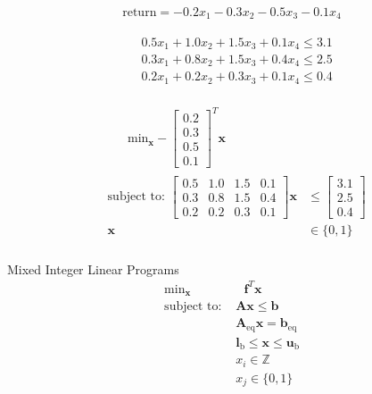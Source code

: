 \documentclass{article}
\begin{document}
\begin{align*}
    \text{return} = -0.2x_1 - 0.3x_2 - 0.5x_3 - 0.1x_4
\end{align*}

\begin{align*}
    &0.5x_1 + 1.0x_2 + 1.5x_3 + 0.1x_4 \le 3.1\\
    &0.3x_1 + 0.8x_2 + 1.5x_3 + 0.4x_4 \le 2.5\\
    &0.2x_1 + 0.2x_2 + 0.3x_3 + 0.1x_4 \le 0.4\\
\end{align*}

\begin{align*}
    &\qquad \text{min}_{\mathbf{x}} -\begin{bmatrix} 0.2 \\ 0.3 \\ 0.5 \\ 0.1 \end{bmatrix}^T \mathbf{x} \\
    &\begin{aligned}
    \mbox{subject to: } \begin{bmatrix} 0.5 & 1.0 & 1.5 & 0.1 \\ 0.3 & 0.8 & 1.5 & 0.4 \\ 0.2 & 0.2 & 0.3 & 0.1 \end{bmatrix} \mathbf{x}
                         &\le \begin{bmatrix} 3.1 \\ 2.5 \\ 0.4 \end{bmatrix} \\
                          \mathbf{x} &\in \{0,1\}\\
    \end{aligned}
\end{align*}

Mixed Integer Linear Programs
\begin{align*}
    \text{min}_{\mathbf{x}}& \text{ } \mathbf{f}^T \mathbf{x} \\
    \mbox{subject to: }& \mathbf{A}\mathbf{x} \le \mathbf{b}\\
                       & \mathbf{A}_{\text{eq}}\mathbf{x} = \mathbf{b}_{\text{eq}}\\
                       & \mathbf{l}_{\text{b}} \le \mathbf{x} \le \mathbf{u}_{\text{b}}\\
                       & x_i \in \mathbb{Z}\\
                       & x_j \in \{0,1\}\\
\end{align*}
\end{document}
